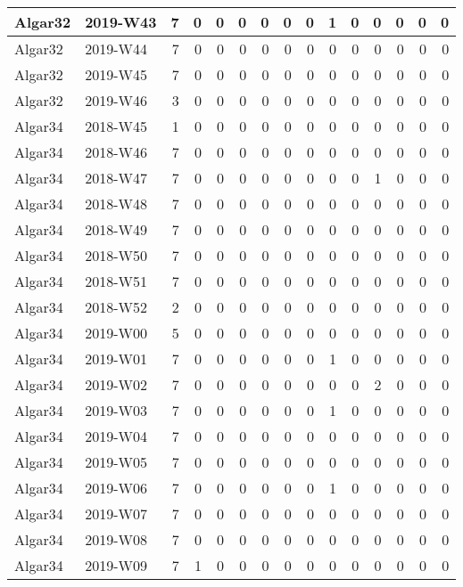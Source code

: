 \documentclass[]{book}
\begin{document}
\begin{table}
\begin{tabular}[t]{l|l|r|r|r|r|r|r|r|r|r|r|r|r|r}
\hline
Algar32 & 2019-W43 & 7 & 0 & 0 & 0 & 0 & 0 & 0 & 1 & 0 & 0 & 0 & 0 & 0\\
\hline
Algar32 & 2019-W44 & 7 & 0 & 0 & 0 & 0 & 0 & 0 & 0 & 0 & 0 & 0 & 0 & 0\\
\hline
Algar32 & 2019-W45 & 7 & 0 & 0 & 0 & 0 & 0 & 0 & 0 & 0 & 0 & 0 & 0 & 0\\
\hline
Algar32 & 2019-W46 & 3 & 0 & 0 & 0 & 0 & 0 & 0 & 0 & 0 & 0 & 0 & 0 & 0\\
\hline
Algar34 & 2018-W45 & 1 & 0 & 0 & 0 & 0 & 0 & 0 & 0 & 0 & 0 & 0 & 0 & 0\\
\hline
Algar34 & 2018-W46 & 7 & 0 & 0 & 0 & 0 & 0 & 0 & 0 & 0 & 0 & 0 & 0 & 0\\
\hline
Algar34 & 2018-W47 & 7 & 0 & 0 & 0 & 0 & 0 & 0 & 0 & 0 & 1 & 0 & 0 & 0\\
\hline
Algar34 & 2018-W48 & 7 & 0 & 0 & 0 & 0 & 0 & 0 & 0 & 0 & 0 & 0 & 0 & 0\\
\hline
Algar34 & 2018-W49 & 7 & 0 & 0 & 0 & 0 & 0 & 0 & 0 & 0 & 0 & 0 & 0 & 0\\
\hline
Algar34 & 2018-W50 & 7 & 0 & 0 & 0 & 0 & 0 & 0 & 0 & 0 & 0 & 0 & 0 & 0\\
\hline
Algar34 & 2018-W51 & 7 & 0 & 0 & 0 & 0 & 0 & 0 & 0 & 0 & 0 & 0 & 0 & 0\\
\hline
Algar34 & 2018-W52 & 2 & 0 & 0 & 0 & 0 & 0 & 0 & 0 & 0 & 0 & 0 & 0 & 0\\
\hline
Algar34 & 2019-W00 & 5 & 0 & 0 & 0 & 0 & 0 & 0 & 0 & 0 & 0 & 0 & 0 & 0\\
\hline
Algar34 & 2019-W01 & 7 & 0 & 0 & 0 & 0 & 0 & 0 & 1 & 0 & 0 & 0 & 0 & 0\\
\hline
Algar34 & 2019-W02 & 7 & 0 & 0 & 0 & 0 & 0 & 0 & 0 & 0 & 2 & 0 & 0 & 0\\
\hline
Algar34 & 2019-W03 & 7 & 0 & 0 & 0 & 0 & 0 & 0 & 1 & 0 & 0 & 0 & 0 & 0\\
\hline
Algar34 & 2019-W04 & 7 & 0 & 0 & 0 & 0 & 0 & 0 & 0 & 0 & 0 & 0 & 0 & 0\\
\hline
Algar34 & 2019-W05 & 7 & 0 & 0 & 0 & 0 & 0 & 0 & 0 & 0 & 0 & 0 & 0 & 0\\
\hline
Algar34 & 2019-W06 & 7 & 0 & 0 & 0 & 0 & 0 & 0 & 1 & 0 & 0 & 0 & 0 & 0\\
\hline
Algar34 & 2019-W07 & 7 & 0 & 0 & 0 & 0 & 0 & 0 & 0 & 0 & 0 & 0 & 0 & 0\\
\hline
Algar34 & 2019-W08 & 7 & 0 & 0 & 0 & 0 & 0 & 0 & 0 & 0 & 0 & 0 & 0 & 0\\
\hline
Algar34 & 2019-W09 & 7 & 1 & 0 & 0 & 0 & 0 & 0 & 0 & 0 & 0 & 0 & 0 & 0\\

\end{tabular}
\end{table}
\end{document}
